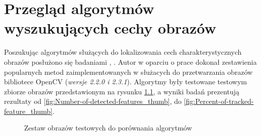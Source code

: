 \chapter{Przegląd algorytmów wyszukujących cechy obrazów}
Poszukując algorytmów służących do lokalizowania cech charakterystycznych obrazów posłużono się badaniami \cite{IK111}, \cite{IK112}. Autor w oparciu o prace \cite{LIFDAS} dokonał zestawienia popularnych metod zaimplementowanych w służacych do przetwarzania obrazów bibliotece OpenCV (\textit{wersje 2.2.0 i 2.3.1}). Algorytmy były testowane testowym zbiorze obrazów przedstawionym na rysunku \ref{fig:zestaw_obrazow_start}, a wyniki badań prezentują rezultaty od \ref{fig:Number-of-detected-features_thumb}, do \ref{fig:Percent-of-tracked-feature_thumb}.

\begin{figure}[!htb]
\begin{center}

\caption{Zestaw obrazów testowych do porównania algorytmów}
\label{fig:zestaw_obrazow_start}
\end{center}
\end{figure}

